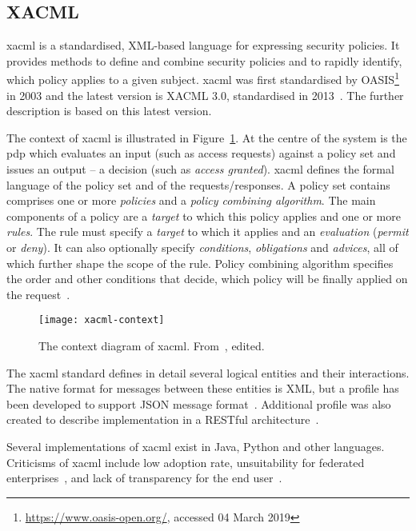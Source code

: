 \subsection{XACML}

 \acrfull{xacml} is a standardised, XML-based language for expressing security policies. It provides methods to define and combine security policies and to rapidly identify, which policy applies to a given subject. \acrshort{xacml} was first standardised by OASIS\footnote{\url{https://www.oasis-open.org/}, accessed 04 March 2019} in 2003 and the latest version is XACML 3.0, standardised in 2013~\cite{OASISStandard2013EXtensible3.0}. The further description is based on this latest version.
 
 The context of \acrshort{xacml} is illustrated in Figure~\ref{fig:xacml-context}. At the centre of the system is the \acrfull{pdp} which evaluates an input (such as access requests) against a policy set and issues an output -- a decision (such as \textit{access granted}). \acrshort{xacml} defines the formal language of the policy set and of the requests/responses. A policy set contains comprises one or more \textit{policies} and a \textit{policy combining algorithm}. The main components of a policy are a \textit{target} to which this policy applies and one or more \textit{rules}. The rule must specify a \textit{target} to which it applies and an \textit{evaluation} (\textit{permit} or \textit{deny}). It can also optionally specify \textit{conditions}, \textit{obligations} and \textit{advices}, all of which further shape the scope of the rule. Policy combining algorithm specifies the order and other conditions that decide, which policy will be finally applied on the request~\cite{OASISStandard2013EXtensible3.0}.
 
 \begin{figure}[ht]
    \centering
    \texttt{[image: xacml-context]}
    \caption{The context diagram of \acrshort{xacml}. From~\cite{OASISStandard2013EXtensible3.0}, edited.
    }
    \label{fig:xacml-context}
\end{figure}
 
The \acrshort{xacml} standard defines in detail several logical entities and their interactions. The native format for messages between these entities is XML, but a profile has been developed to support JSON message format~\cite{2017JSON1.0}. Additional profile was also created to describe implementation in a RESTful architecture~\cite{2017REST1.0}.
 
 Several implementations of \acrshort{xacml} exist in Java, Python and other languages. Criticisms of \acrshort{xacml} include low adoption rate, unsuitability for federated enterprises~\cite{Cser2013XACMLDead}, and lack of transparency for the end user~\cite{Cser2013XACMLDead, Ardagna2011ExpressiveApplications}.

